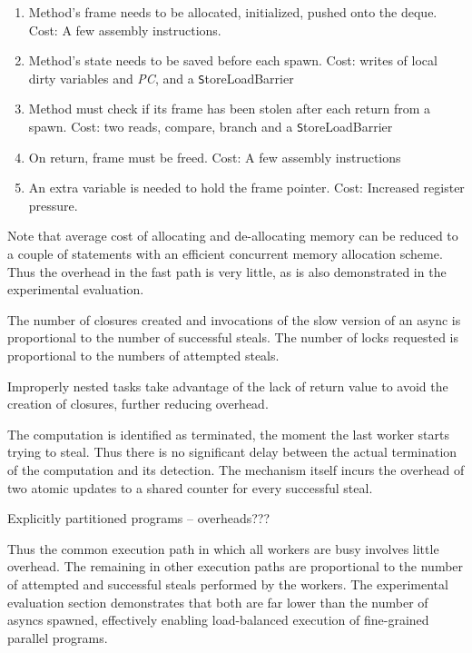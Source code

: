 \begin{enumerate}
\item Method's frame needs to be allocated, initialized, pushed onto
  the deque. Cost: A few assembly instructions.
\item Method's state needs to be saved before each spawn. Cost: writes
  of local dirty variables and {\em PC}, and a {\texttt
  StoreLoadBarrier}
\item Method must check if its frame has been stolen after each
  return from a spawn. Cost: two reads, compare, branch and a 
  {\texttt StoreLoadBarrier} 
\item On return, frame must be freed. Cost: A few assembly instructions
\item An extra variable is needed to hold the frame pointer. Cost: Increased
  register pressure.
\end{enumerate}

Note that average cost of allocating and de-allocating memory can be
reduced to a couple of statements with an efficient concurrent memory
allocation scheme. Thus the overhead in the fast path is very
little, as is also demonstrated in the experimental evaluation.

The number of closures created and invocations of the slow version of
an async is proportional to the number of successful steals. The
number of locks requested is proportional to the numbers of attempted
steals. 

Improperly nested tasks take advantage of the lack of return value to
avoid the creation of closures, further reducing overhead. 

The computation is identified as terminated, the moment the last
worker starts trying to steal. Thus there is no significant delay
between the actual termination of the computation and its detection.
The mechanism itself incurs the overhead of two atomic updates to a
shared counter for every successful steal. 

Explicitly partitioned programs -- overheads???

Thus the common execution path in which all workers are busy involves
little overhead. The remaining in other execution paths are
proportional to the number of attempted and successful steals
performed by the workers. The experimental evaluation section
demonstrates that both are far lower than the number of asyncs
spawned, effectively enabling load-balanced execution of fine-grained
parallel programs.

